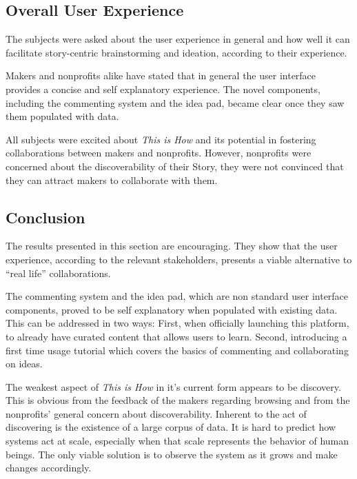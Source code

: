 \subsection{Overall User Experience}
The subjects were asked about the user experience in general and how well it can facilitate story-centric brainstorming and ideation, according to their experience.  

Makers and nonprofits alike have stated that in general the user interface provides a concise and self explanatory experience. The novel components, including the commenting system and the idea pad, became clear once they saw them populated with data.     

All subjects were excited about \textit{This is How} and its potential in fostering collaborations between makers and nonprofits. However, nonprofits were concerned about the discoverability of their Story, they were not convinced that they can attract makers to collaborate with them.     

\subsection{Conclusion}

The results presented in this section are encouraging. They show that the user experience, according to the relevant stakeholders, presents a viable alternative to ``real life'' collaborations.

The commenting system and the idea pad, which are non standard user interface components, proved to be self explanatory when populated with existing data. This can be addressed in two ways: First, when officially launching this platform, to already have curated content that allows users to learn. Second, introducing a first time usage tutorial which covers the basics of commenting and collaborating on ideas.

The weakest aspect of \textit{This is How} in it's current form appears to be discovery. This is obvious from the feedback of the makers regarding browsing and from the nonprofits' general concern about discoverability. Inherent to the act of discovering is the existence of a large corpus of data. It is hard to predict how systems act at scale, especially when that scale represents the behavior of human beings. The only viable solution is to observe the system as it grows and make changes accordingly.